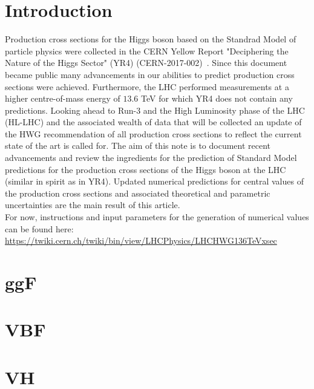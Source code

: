 \documentclass[11pt]{report}
\renewcommand*{\thefootnote}{\fnsymbol{footnote}}
\begin{document}
\section*{Introduction}
\renewcommand*{\thefootnote}{\arabic{footnote}}
\setcounter{footnote}{0}
\setcounter{page}{1}
Production cross sections for the Higgs boson based on the Standrad Model of particle physics were collected in the CERN Yellow Report "Deciphering the Nature of the Higgs Sector" (YR4) (CERN-2017-002)~\cite{LHCHiggsCrossSectionWorkingGroup:2016ypw}.  
Since this document became public many advancements in our abilities to predict production cross sections were achieved. 
Furthermore, the LHC performed measurements at a higher centre-of-mass energy of $13.6$ TeV for which YR4 does not contain any predictions.
Looking ahead to Run-3 and the High Luminosity phase of the LHC  (HL-LHC) and the associated wealth of data that will be collected an update of the HWG recommendation of all production cross sections to reflect the current state of the art is called for.
The aim of this note is to document recent advancements and review the ingredients for the prediction of Standard Model predictions for the production cross sections of the Higgs boson at the LHC (similar in spirit as in YR4). 
Updated numerical predictions for central values of the production cross sections and associated theoretical and parametric uncertainties are the main result of this article. 
\\
For now, instructions and input parameters for the generation of numerical values can be found here:  \url{https://twiki.cern.ch/twiki/bin/view/LHCPhysics/LHCHWG136TeVxsec}


\section*{ggF}


\section*{VBF}


\section*{VH}


\end{document}
